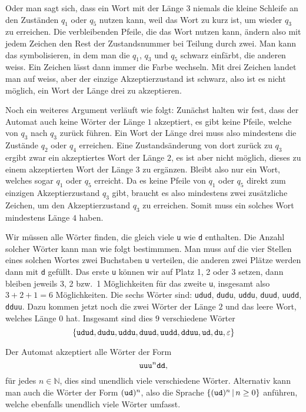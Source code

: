 \begin{loesung}
\begin{teilaufgaben}
Oder man sagt sich, dass ein Wort mit der Länge $3$ niemals die kleine
Schleife an den Zuständen $q_1$ oder $q_5$ nutzen kann, weil das Wort
zu kurz ist, um wieder $q_3$ zu erreichen. Die verbleibenden Pfeile,
die das Wort nutzen kann, ändern also mit jedem Zeichen den Rest
der Zustandsnummer bei Teilung durch zwei. Man kann das symbolisieren,
in dem man die $q_1$, $q_3$ und $q_5$ schwarz einfärbt, die anderen
weiss. Ein Zeichen lässt dann immer die Farbe wechseln. Mit drei Zeichen
landet man auf weiss, aber der einzige Akzeptierzustand ist schwarz,
also ist es nicht möglich, ein Wort der Länge drei zu akzeptieren.

Noch ein weiteres Argument verläuft wie folgt:
Zunächst halten wir fest, dass der Automat auch keine Wörter der
Länge $1$ akzeptiert, es gibt keine Pfeile, welche von $q_3$ nach
$q_3$ zurück führen. Ein Wort der Länge drei muss also mindestens
die Zustände $q_2$ oder $q_4$ erreichen. Eine Zustandsänderung von
dort zurück zu $q_3$ ergibt zwar ein akzeptiertes Wort der Länge
$2$, es ist aber nicht möglich, dieses zu einem akzeptierten Wort
der Länge $3$ zu ergänzen.
Bleibt also nur ein Wort, welches
sogar $q_1$ oder $q_5$ erreicht. Da es keine Pfeile von $q_1$
oder $q_5$ direkt zum einzigen Akzeptierzustand $q_3$ gibt,
braucht es also mindestens zwei zusätzliche Zeichen, um den
Akzeptierzustand $q_3$ zu erreichen. Somit muss ein solches
Wort mindestens Länge $4$ haben.
\item Wir müssen alle Wörter finden, die gleich viele {\tt u} wie {\tt d}
enthalten. Die Anzahl solcher Wörter kann man wie folgt bestimmmen.
Man muss auf die vier Stellen eines solchen Wortes zwei Buchstaben
{\tt u} verteilen, die anderen zwei Plätze werden dann mit {\tt d}
gefüllt. Das erste {\tt u} können wir auf Platz 1, 2 oder 3 setzen,
dann bleiben jeweils 3, 2 bzw.~1 Möglichkeiten für das zweite {\tt u},
insgesamt also $3+2+1=6$ Möglichkeiten. Die sechs Wörter sind:
{\tt udud}, {\tt dudu}, {\tt uddu}, {\tt duud}, {\tt uudd}, {\tt dduu}.
Dazu kommen jetzt noch die zwei Wörter der Länge $2$ und das leere Wort,
welches Länge $0$ hat. Insgesamt sind dies $9$ verschiedene Wörter
\[
\{
{\tt udud}, {\tt dudu}, {\tt uddu}, {\tt duud}, {\tt uudd}, {\tt dduu},
{\tt ud},{\tt du}, \varepsilon
\}
\]
\item Der Automat akzeptiert alle Wörter der Form
\[
\text{\tt uu}
\text{\tt u}^n
\text{\tt dd},
\]
für jedes $n\in \mathbb N$,
dies sind unendlich viele verschiedene Wörter. Alternativ kann
man auch die Wörter der Form $({\tt ud})^n$, also die Sprache
$\{({\tt ud})^n\,|\,n\ge 0\}$ anführen,
welche ebenfalls unendlich viele Wörter umfasst.
\qedhere
\end{teilaufgaben}
\end{loesung}

